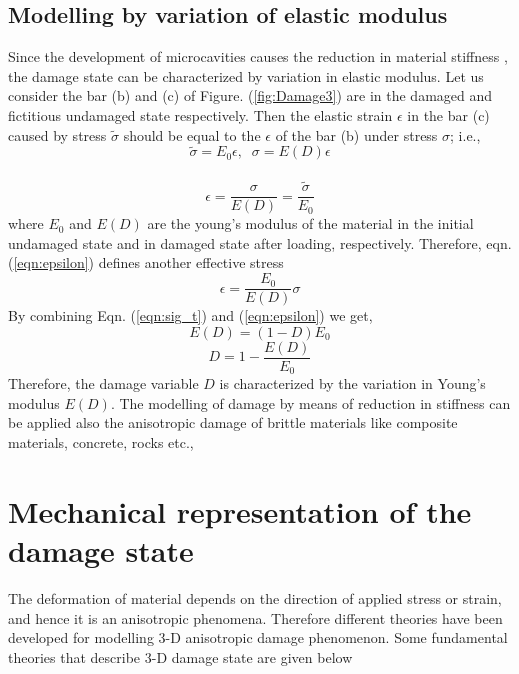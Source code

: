 \documentclass[a4paper,12pt,twoside]{report}
\begin{document}
\subsection{Modelling by variation of elastic modulus} 
\indent\indent\indent Since the development of microcavities causes the reduction in material stiffness , the damage state can be characterized by variation in elastic modulus. Let us consider the bar (b) and (c) of Figure. (\ref{fig:Damage3}) are in the damaged and fictitious undamaged state respectively. Then the elastic strain $\epsilon$ in the bar (c) caused by stress $\tilde{\sigma}$ should be equal to the $\epsilon$ of the bar (b) under stress $\sigma$; i.e.,\\
\begin{equation}
\label{eqn:sig_t2}
   \tilde{\sigma} = E_{0}\epsilon, \;\;  \sigma = E(D)\epsilon 
\end{equation}
\\
\begin{equation}
\label{eqn:epsilon}
\epsilon = \frac{\sigma}{E(D)} = \frac{\tilde{\sigma}}{E_{0}}
\end{equation}
where $E_{0}$ and $E(D)$ are the young's modulus of the material in the initial undamaged state and in damaged state after loading, respectively. Therefore, eqn. (\ref{eqn:epsilon}) defines another effective stress\\
\begin{equation}
\label{eqn:epsilon2}
\epsilon = \frac{E_{0}}{E(D)}\sigma
\end{equation}
By combining Eqn. (\ref{eqn:sig_t}) and (\ref{eqn:epsilon}) we get,
\begin{equation}
\label{eqn:E(d)}
E(D) = (1 - D) E_{0}
\end{equation}
\begin{equation}
\label{eqn:D2}
D  = 1 - \frac{E(D)}{E_{0}}
\end{equation}
Therefore, the damage variable $D$ is characterized by the variation in Young's modulus $E(D)$. The modelling of damage by means of reduction in stiffness can be applied also the anisotropic damage of brittle materials like composite materials, concrete, rocks etc.,
\section{Mechanical representation of the damage state}
\indent\indent\indent The deformation of material depends on the direction of applied stress or strain, and hence it is an anisotropic phenomena. Therefore different theories have been developed for modelling 3-D anisotropic damage phenomenon. Some fundamental theories that describe 3-D damage state are given below 
\end{document}
